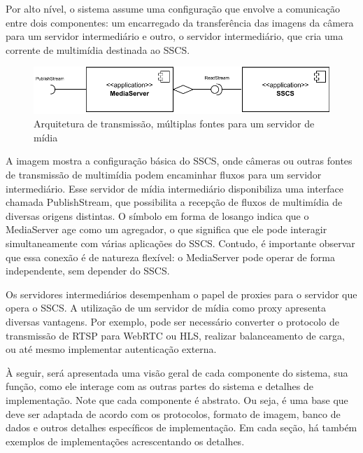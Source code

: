 \documentclass[12pt, %
openright, 
oneside, %
a4paper,    %
brazil]{facom-ufu-abntex2}
\begin{document}
Por alto nível, o sistema assume uma configuração que envolve a comunicação
entre dois componentes: um encarregado da transferência das imagens da câmera
para um servidor intermediário e outro, o servidor intermediário, que cria uma
corrente de multimídia destinada ao SSCS.

\begin{figure}[!ht]
	\centering
	\includegraphics[width=1\linewidth]{arch1.pdf}
	\caption[Exemplo de arquitetura de transmissão]{Arquitetura de
		transmissão, múltiplas fontes para um servidor de mídia}
	\label{fig:graficosVariandoTamanhoRede}
\end{figure}


A imagem mostra a configuração básica do SSCS, onde câmeras ou outras fontes de
transmissão de multimídia podem encaminhar fluxos para um servidor
intermediário. Esse servidor de mídia intermediário disponibiliza uma interface
chamada PublishStream, que possibilita a recepção de fluxos de multimídia de
diversas origens distintas. O símbolo em forma de losango indica que o
MediaServer age como um agregador, o que significa que ele pode interagir
simultaneamente com várias aplicações do SSCS. Contudo, é importante observar
que essa conexão é de natureza flexível: o MediaServer pode operar de forma
independente, sem depender do SSCS.

Os servidores intermediários desempenham o papel de proxies para o servidor que
opera o SSCS. A utilização de um servidor de mídia como proxy apresenta
diversas vantagens. Por exemplo, pode ser necessário converter o protocolo de
transmissão de RTSP para WebRTC ou HLS, realizar balanceamento de carga, ou até
mesmo implementar autenticação externa.

À seguir, será apresentada uma visão geral de cada componente do sistema, sua
função, como ele interage com as outras partes do sistema e detalhes de
implementação. Note que cada componente é abstrato. Ou seja, é uma base que
deve ser adaptada de acordo com os protocolos, formato de imagem, banco de
dados e outros detalhes específicos de implementação. Em cada seção, há também
exemplos de implementações acrescentando os detalhes.
\end{document}
